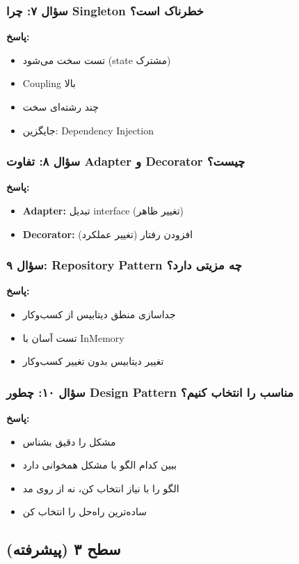 \documentclass[12pt, a4paper]{article}
\begin{document}
\subsubsection{سؤال ۷: چرا Singleton خطرناک است؟}
\textbf{پاسخ:}
\begin{itemize}
    \item تست سخت می‌شود (state مشترک)
    \item Coupling بالا
    \item چند رشته‌ای سخت
    \item جایگزین: Dependency Injection
\end{itemize}

\subsubsection{سؤال ۸: تفاوت Adapter و Decorator چیست؟}
\textbf{پاسخ:}
\begin{itemize}
    \item \textbf{Adapter:} تبدیل interface (تغییر ظاهر)
    \item \textbf{Decorator:} افزودن رفتار (تغییر عملکرد)
\end{itemize}

\subsubsection{سؤال ۹: Repository Pattern چه مزیتی دارد؟}
\textbf{پاسخ:}
\begin{itemize}
    \item جداسازی منطق دیتابیس از کسب‌وکار
    \item تست آسان با InMemory
    \item تغییر دیتابیس بدون تغییر کسب‌وکار
\end{itemize}

\subsubsection{سؤال ۱۰: چطور Design Pattern مناسب را انتخاب کنیم؟}
\textbf{پاسخ:}
\begin{itemize}
    \item مشکل را دقیق بشناس
    \item ببین کدام الگو با مشکل همخوانی دارد
    \item الگو را با نیاز انتخاب کن، نه از روی مد
    \item ساده‌ترین راه‌حل را انتخاب کن
\end{itemize}

\subsection{سطح ۳ (پیشرفته)}
\end{document}
